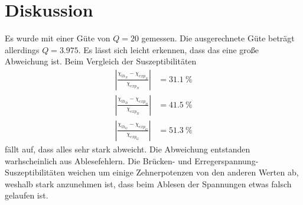 \section{Diskussion}
\label{sec:Diskussion}

Es wurde mit einer Güte von $Q=20$ gemessen. Die ausgerechnete Güte beträgt allerdings $Q=3.975$. Es lässt sich leicht erkennen, dass das eine große Abweichung ist. 
Beim Vergleich der Suszeptibilitäten 
\begin{align*}
  |\frac{\chi_{th_{N}}-\chi_{exp_{N}}}{\chi_{exp_{N}}}|&=31.1\ \%\\
  |\frac{\chi_{th_{D}}-\chi_{exp_{D}}}{\chi_{exp_{D}}}|&=41.5\ \%\\
  |\frac{\chi_{th_{G}}-\chi_{exp_{G}}}{\chi_{exp_{G}}}|&=51.3\ \%
\end{align*}
fällt auf, dass alles sehr stark abweicht. Die Abweichung entstanden warhscheinlich aus Ablesefehlern. Die Brücken- und Erregerspannung-Suszeptibilitäten weichen um einige Zehnerpotenzen von den anderen Werten ab, weshalb stark anzunehmen ist, dass beim Ablesen der Spannungen etwas falsch gelaufen ist. 
